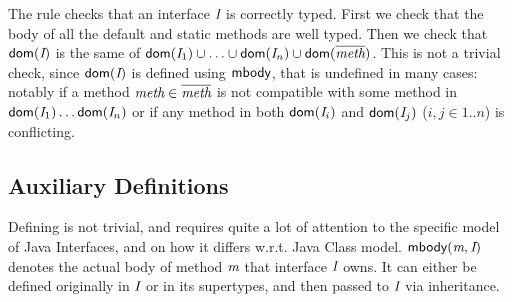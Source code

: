 The rule  checks that an interface $\textit{I}$ is correctly
typed.  First we check that the body of all the default and static
methods are well typed.  Then we check that $\textsf{dom}(\textit{I})$ is the same of
$\textsf{dom}(\textit{I}_1)\cup\ldots\cup\textsf{dom}(\textit{I}_n)\cup\textsf{dom}(\overline{\textit{meth}})$.  This is not a
trivial check, since $\textsf{dom}(\textit{I})$ is defined using $\textsf{mbody}$, that is
undefined in many cases: notably if a method $\textit{meth}\in\overline{\textit{meth}}$ is
not compatible with some method in $\textsf{dom}(\textit{I}_1)\ldots\textsf{dom}(\textit{I}_n)$ or if
any method in both $\textsf{dom}(\textit{I}_i)$ and $\textsf{dom}(\textit{I}_j)$ ($i,j\in 1..n$) is
conflicting.

\subsection{Auxiliary Definitions}

\begin{comment}
\subsubsection{Auxiliary function: \textsf{mtype}}
- \textsf{mtype(m, C)} : the signature of method m in C.

\[ \inferrule{
  IT(T) = \text{\emph{ann} interface } C \{ \overline{M} \} \\
  E \spc m(\overline{D} \spc \overline{x}) \{ \text{return } e; \} \in M}
{ \textsf{mtype(m,T)} = \overline{D} \to E } \]

\[ \inferrule{
  IT(T) = \text{\emph{ann} interface } C \{ \overline{M} \} \\
  m \notin M}
{ \textsf{mtype(m,T)} = \emptyset } \]

\[ \inferrule{
  IT(T) = \text{\emph{ann} interface } C \text{ extends } C_1,...,C_k \{ \overline{M} \} \\
  E \spc m(\overline{D} \spc \overline{x}) \{ \text{return } e; \} \in M}
{ \textsf{mtype(m,T)} = \overline{D} \to E } \]

\[ \inferrule{
  IT(T) = \text{\emph{ann} interface } C_0 \text{ extends } \overline{C} \{
  \overline{M} \} \\
  m \notin M}
{ \textsf{mtype(m,T)} = \bigcup \textsf{mtype}(m,\overline{D}) } \]
\end{comment}


Defining \mBody{} is not trivial, and requires quite a lot of attention to the specific model of Java Interfaces, and on how it differs w.r.t. Java Class model.
$\textsf{mbody}(\textit{m},\textit{I})$ denotes the actual body of method $\textit{m}$ that interface $\textit{I}$ owns. It can either be defined originally in $\textit{I}$ or in its supertypes, and then passed to $\textit{I}$ via inheritance.


